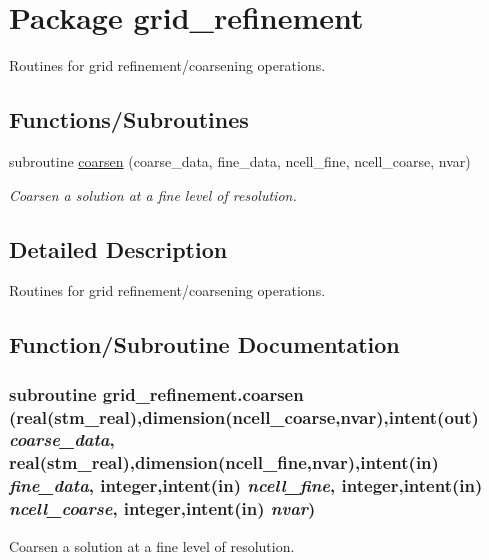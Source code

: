 \hypertarget{a00062}{
\section{Package grid\_\-refinement}
\label{a00062}
}
Routines for grid refinement/coarsening operations.  


\subsection*{Functions/Subroutines}
\begin{CompactItemize}
\item 
subroutine \hyperlink{a00062_99b7a47dc715dbb51c2ddab900f7ce69}{coarsen} (coarse\_\-data, fine\_\-data, ncell\_\-fine, ncell\_\-coarse, nvar)
\begin{CompactList}\small\item\em Coarsen a solution at a fine level of resolution. \item\end{CompactList}\end{CompactItemize}


\subsection{Detailed Description}
Routines for grid refinement/coarsening operations. 



\subsection{Function/Subroutine Documentation}
\hypertarget{a00062_99b7a47dc715dbb51c2ddab900f7ce69}{
\subsubsection[{coarsen}]{\setlength{\rightskip}{0pt plus 5cm}subroutine grid\_\-refinement.coarsen (real(stm\_\-real),dimension(ncell\_\-coarse,nvar),intent(out) {\em coarse\_\-data}, \/  real(stm\_\-real),dimension(ncell\_\-fine,nvar),intent(in) {\em fine\_\-data}, \/  integer,intent(in) {\em ncell\_\-fine}, \/  integer,intent(in) {\em ncell\_\-coarse}, \/  integer,intent(in) {\em nvar})}}
\label{a00062_99b7a47dc715dbb51c2ddab900f7ce69}


Coarsen a solution at a fine level of resolution. 

